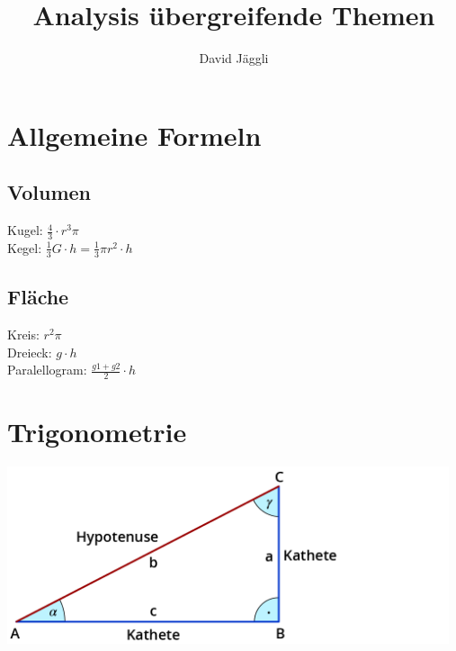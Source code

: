 \documentclass[12pt]{scrartcl}
\author{David Jäggli}
\title{Analysis übergreifende Themen}
\begin{document}
\maketitle

\tableofcontents

\newpage
\section{Allgemeine Formeln}
\subsection{Volumen}
Kugel: $\frac{4}{3} \cdot r^3 \pi$ \\
Kegel: $\frac{1}{3}G \cdot h = \frac{1}{3} \pi r^2 \cdot h$

\subsection{Fläche}
Kreis: $r^2 \pi $\\
Dreieck: $g \cdot h$\\
Paralellogram: $\frac{g1 + g2}{2} \cdot h$


\newpage
\section{Trigonometrie}

\begin{center}
    \includegraphics[width=13cm]{img/rechtw_dreieck.png}\\
\end{center}

\noindent
\end{document}
